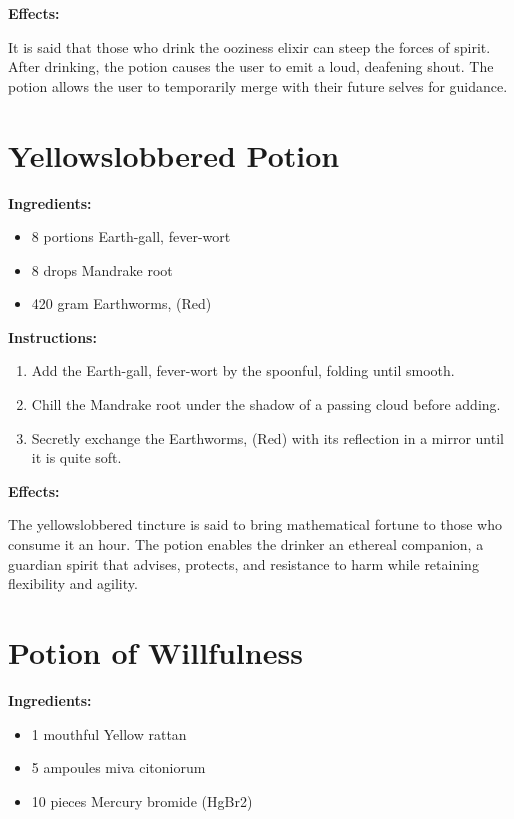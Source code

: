 \documentclass{article}
\begin{document}
\textbf{Effects:}

It is said that those who drink the ooziness elixir can steep the forces of spirit. After drinking, the potion causes the user to emit a loud, deafening shout. The potion allows the user to temporarily merge with their future selves for guidance.

\newpage
\section*{Yellowslobbered Potion}

\textbf{Ingredients:}

\begin{itemize}
  \item 8 portions Earth-gall, fever-wort
  \item 8 drops Mandrake root
  \item 420 gram Earthworms, (Red)
\end{itemize}

\textbf{Instructions:}

\begin{enumerate}
  \item Add the Earth-gall, fever-wort by the spoonful, folding until smooth.
  \item Chill the Mandrake root under the shadow of a passing cloud before adding.
  \item Secretly exchange the Earthworms, (Red) with its reflection in a mirror until it is quite soft.
\end{enumerate}

\textbf{Effects:}

The yellowslobbered tincture is said to bring mathematical fortune to those who consume it an hour. The potion enables the drinker an ethereal companion, a guardian spirit that advises, protects, and resistance to harm while retaining flexibility and agility.

\newpage
\section*{Potion of Willfulness}

\textbf{Ingredients:}

\begin{itemize}
  \item 1 mouthful Yellow rattan
  \item 5 ampoules miva citoniorum
  \item 10 pieces Mercury bromide (HgBr2)
\end{itemize}
\end{document}
